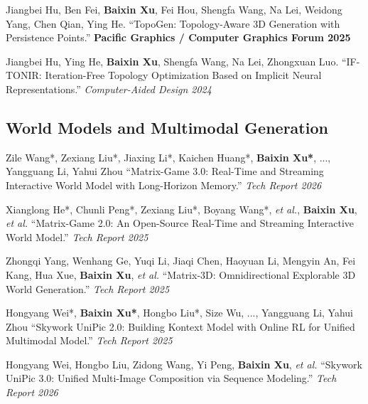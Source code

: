 \documentclass[11pt,letterpaper]{report}
\newcommand{\listitemspace}{0.25em}
\renewenvironment{itemize}
{\begin{list}{}{\setlength{\leftmargin}{0em}
                \setlength{\parskip}{0em}
                \setlength{\itemsep}{\listitemspace}
                \setlength{\parsep}{\listitemspace}}}
{\end{list}}
\begin{document}
\begin{itemize}
        \item Jiangbei Hu, Ben Fei, \textbf{Baixin Xu}, Fei Hou, Shengfa Wang, Na Lei, Weidong Yang, Chen Qian, Ying He. \enquote{TopoGen: Topology-Aware 3D Generation with Persistence Points.} \textbf{Pacific Graphics / Computer Graphics Forum 2025}

        \item Jiangbei Hu, Ying He, \textbf{Baixin Xu}, Shengfa Wang, Na Lei, Zhongxuan Luo. \enquote{IF-TONIR: Iteration-Free Topology Optimization Based on Implicit Neural Representations.} \textit{Computer-Aided Design 2024}
    \end{itemize}

    \subsection*{World Models and Multimodal Generation}
    \begin{itemize}
        \item Zile Wang*, Zexiang Liu*, Jiaxing Li*, Kaichen Huang*, \textbf{Baixin Xu*}, ..., Yangguang Li, Yahui Zhou \enquote{Matrix-Game 3.0: Real-Time and Streaming Interactive World Model with Long-Horizon Memory.} \textit{Tech Report 2026}

        \item Xianglong He*, Chunli Peng*, Zexiang Liu*, Boyang Wang*, \textit{et al.}, \textbf{Baixin Xu}, \textit{et al.} \enquote{Matrix-Game 2.0: An Open-Source Real-Time and Streaming Interactive World Model.} \textit{Tech Report 2025}

        \item Zhongqi Yang, Wenhang Ge, Yuqi Li, Jiaqi Chen, Haoyuan Li, Mengyin An, Fei Kang, Hua Xue, \textbf{Baixin Xu}, \textit{et al.} \enquote{Matrix-3D: Omnidirectional Explorable 3D World Generation.} \textit{Tech Report 2025}

        \item Hongyang Wei*, \textbf{Baixin Xu*}, Hongbo Liu*, Size Wu, ..., Yangguang Li, Yahui Zhou \enquote{Skywork UniPic 2.0: Building Kontext Model with Online RL for Unified Multimodal Model.} \textit{Tech Report 2025}

        \item Hongyang Wei, Hongbo Liu, Zidong Wang, Yi Peng, \textbf{Baixin Xu}, \textit{et al.} \enquote{Skywork UniPic 3.0: Unified Multi-Image Composition via Sequence Modeling.} \textit{Tech Report 2026}
    \end{itemize}
    \vspace{-0.25in}
    
\end{document}

